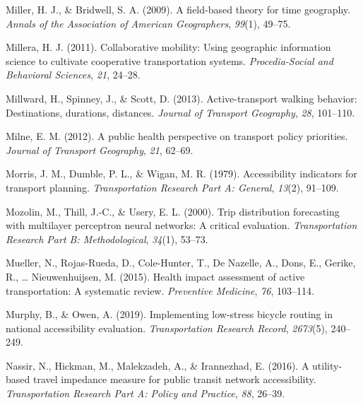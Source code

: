 \documentclass[12pt,twoside]{reedthesis}
\newlength{\cslhangindent}
\newenvironment{CSLReferences}[2] %
 {%
  \setlength{\parindent}{0pt}
  \ifodd #1 \everypar{\setlength{\hangindent}{\cslhangindent}}\ignorespaces\fi
  \ifnum #2 > 0
  \setlength{\parskip}{#2\baselineskip}
  \fi
 }%
 {}
\begin{document}
\begin{CSLReferences}{1}{0}
\leavevmode{}%
Miller, H. J., \& Bridwell, S. A. (2009). A field-based theory for time geography. \emph{Annals of the Association of American Geographers}, \emph{99}(1), 49--75.

\leavevmode{}%
Millera, H. J. (2011). Collaborative mobility: Using geographic information science to cultivate cooperative transportation systems. \emph{Procedia-Social and Behavioral Sciences}, \emph{21}, 24--28.

\leavevmode{}%
Millward, H., Spinney, J., \& Scott, D. (2013). Active-transport walking behavior: Destinations, durations, distances. \emph{Journal of Transport Geography}, \emph{28}, 101--110.

\leavevmode{}%
Milne, E. M. (2012). A public health perspective on transport policy priorities. \emph{Journal of Transport Geography}, \emph{21}, 62--69.

\leavevmode{}%
Morris, J. M., Dumble, P. L., \& Wigan, M. R. (1979). Accessibility indicators for transport planning. \emph{Transportation Research Part A: General}, \emph{13}(2), 91--109.

\leavevmode{}%
Mozolin, M., Thill, J.-C., \& Usery, E. L. (2000). Trip distribution forecasting with multilayer perceptron neural networks: A critical evaluation. \emph{Transportation Research Part B: Methodological}, \emph{34}(1), 53--73.

\leavevmode{}%
Mueller, N., Rojas-Rueda, D., Cole-Hunter, T., De Nazelle, A., Dons, E., Gerike, R., \ldots{} Nieuwenhuijsen, M. (2015). Health impact assessment of active transportation: A systematic review. \emph{Preventive Medicine}, \emph{76}, 103--114.

\leavevmode{}%
Murphy, B., \& Owen, A. (2019). Implementing low-stress bicycle routing in national accessibility evaluation. \emph{Transportation Research Record}, \emph{2673}(5), 240--249.

\leavevmode{}%
Nassir, N., Hickman, M., Malekzadeh, A., \& Irannezhad, E. (2016). A utility-based travel impedance measure for public transit network accessibility. \emph{Transportation Research Part A: Policy and Practice}, \emph{88}, 26--39.


\end{CSLReferences}
\end{document}
